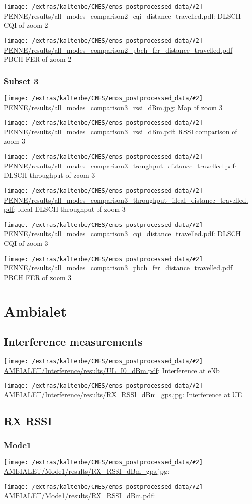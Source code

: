 \documentclass[a4paper,10pt]{article}
\newcommand{\printfile}[2][]{
 \begin{minipage}{8cm}
  \centering
  \texttt{[image: /extras/kaltenbe/CNES/emos\_postprocessed\_data/\#2]}
  \url{#2}: #1

 \end{minipage}
}
\begin{document}
\printfile[DLSCH CQI of zoom 2]{PENNE/results/all_modes_comparison2_cqi_distance_travelled.pdf}
\printfile[PBCH FER of zoom 2]{PENNE/results/all_modes_comparison2_pbch_fer_distance_travelled.pdf}

\subsubsection*{Subset 3}

\printfile[Map of zoom 3]{PENNE/results/all_modes_comparison3_rssi_dBm.jpg}
\printfile[RSSI comparison of zoom 3]{PENNE/results/all_modes_comparison3_rssi_dBm.pdf}

\printfile[DLSCH throughput of zoom 3]{PENNE/results/all_modes_comparison3_troughput_distance_travelled.pdf}
\printfile[Ideal DLSCH throughput of zoom 3]{PENNE/results/all_modes_comparison3_throughput_ideal_distance_travelled.pdf}

\printfile[DLSCH CQI of zoom 3]{PENNE/results/all_modes_comparison3_cqi_distance_travelled.pdf}
\printfile[PBCH FER of zoom 3]{PENNE/results/all_modes_comparison3_pbch_fer_distance_travelled.pdf}


\section{Ambialet}
\label{sec:ambialet}

\subsection{Interference measurements}

\printfile[Interference at eNb]{AMBIALET/Interference/results/UL_I0_dBm.pdf}
\printfile[Interference at UE]{AMBIALET/Interference/results/RX_RSSI_dBm_gps.jpg}


\subsection{RX RSSI}


% 

\subsubsection{Mode1}
\printfile{AMBIALET/Mode1/results/RX_RSSI_dBm_gps.jpg}
\printfile{AMBIALET/Mode1/results/RX_RSSI_dBm.pdf}
\end{document}
